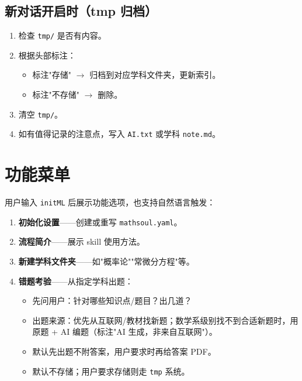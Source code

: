 \documentclass[12pt,a4paper]{ctexart}
\begin{document}
\subsection{新对话开启时（tmp 归档）}

\begin{enumerate}
  \item 检查 \texttt{tmp/} 是否有内容。
  \item 根据头部标注：
    \begin{itemize}
      \item 标注"存储" $\to$ 归档到对应学科文件夹，更新索引。
      \item 标注"不存储" $\to$ 删除。
    \end{itemize}
  \item 清空 \texttt{tmp/}。
  \item 如有值得记录的注意点，写入 \texttt{AI.txt} 或学科 \texttt{note.md}。
\end{enumerate}

\section{功能菜单}

用户输入 \texttt{initML} 后展示功能选项，也支持自然语言触发：

\begin{enumerate}
  \item \textbf{初始化设置}——创建或重写 \texttt{mathsoul.yaml}。
  \item \textbf{流程简介}——展示 skill 使用方法。
  \item \textbf{新建学科文件夹}——如"概率论""常微分方程"等。
  \item \textbf{错题考验}——从指定学科出题：
    \begin{itemize}
      \item 先问用户：针对哪些知识点/题目？出几道？
      \item 出题来源：优先从互联网/教材找新题；数学系级别找不到合适新题时，用原题 + AI 编题（标注"AI 生成，非来自互联网"）。
      \item 默认先出题不附答案，用户要求时再给答案 PDF。
      \item 默认不存储；用户要求存储则走 \texttt{tmp} 系统。
    \end{itemize}
\end{enumerate}

\end{document}
